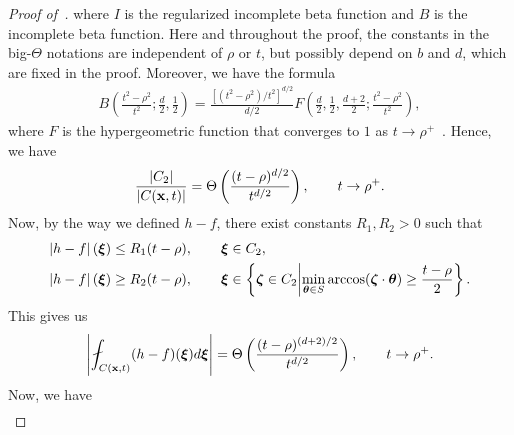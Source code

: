 \begin{proof}[Proof of~]
where $I$ is the regularized incomplete beta function and $B$ is the incomplete beta function. Here and throughout the proof, the constants in the big-$\Theta$ notations are independent of $\rho$ or $t$, but possibly depend on $b$ and $d$, which are fixed in the proof. Moreover, we have the formula
\begin{align*}
    B\left(\frac{t^2-\rho^2}{t^2}; \frac{d}{2}, \frac{1}{2}\right) = \frac{[(t^2 - \rho^2)/t^2]^{d/2}}{d/2} F\left(\frac{d}{2}, \frac{1}{2}, \frac{d+2}{2}; \frac{t^2-\rho^2}{t^2}\right),
\end{align*}
where $F$ is the hypergeometric function that converges to $1$ as $t \rightarrow \rho^+$~\cite[sect.~8.17,~sect.~15.2]{DLMF}. Hence, we have
\begin{equation}\label{eq.volume}
    \frac{\left|C_2\right|}{\left|C(\mathbf{x},t)\right|} = \Theta\left(\frac{(t-\rho)^{d/2}}{t^{d/2}}\right),\qquad t \rightarrow \rho^+.
\end{equation}
Now, by the way we defined $h-f$, there exist constants $R_1, R_2 > 0$ such that
\begin{align*}
    \left|h-f\right|(\boldsymbol{\xi}) \leq R_1(t-\rho)&, \qquad \boldsymbol{\xi} \in C_2,\\
    \left|h-f\right|(\boldsymbol{\xi}) \geq R_2(t-\rho)&, \qquad \boldsymbol{\xi} \in \left\{\boldsymbol{\zeta} \in C_2 \middle| \min_{\boldsymbol{\theta} \in S} \arccos(\boldsymbol{\zeta} \cdot \boldsymbol{\theta}) \geq \frac{t - \rho}{2}\right\}.
\end{align*}
This gives us
\begin{equation}
    \abs{\fint_{C(\mathbf{x},t)} (h-f)(\boldsymbol{\xi}) d\boldsymbol{\xi}} = \Theta\left(\frac{(t-\rho)^{(d+2)/2}}{t^{d/2}}\right), \qquad t \rightarrow \rho^+. 
\end{equation}
Now, we have
\begin{align*}

\end{align*}
\end{proof}
